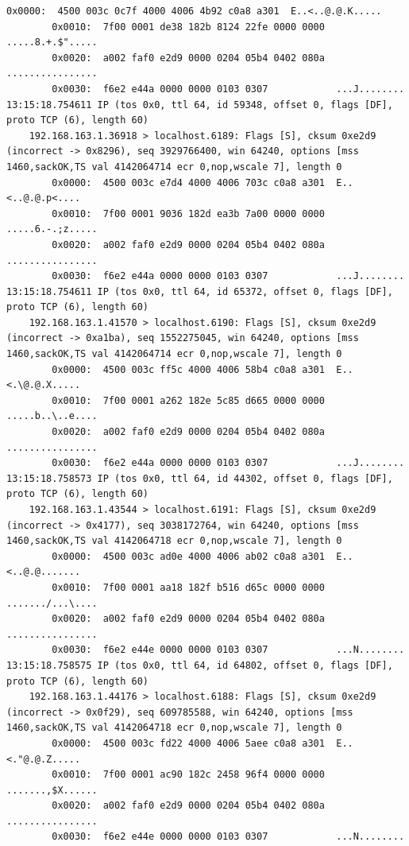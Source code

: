 \documentclass[11pt, a4paper]{article}
\begin{document}
\begin{Verbatim}[fontsize=\footnotesize,breaklines=true]
        0x0000:  4500 003c 0c7f 4000 4006 4b92 c0a8 a301  E..<..@.@.K.....
        0x0010:  7f00 0001 de38 182b 8124 22fe 0000 0000  .....8.+.$".....
        0x0020:  a002 faf0 e2d9 0000 0204 05b4 0402 080a  ................
        0x0030:  f6e2 e44a 0000 0000 0103 0307            ...J........
13:15:18.754611 IP (tos 0x0, ttl 64, id 59348, offset 0, flags [DF], proto TCP (6), length 60)
    192.168.163.1.36918 > localhost.6189: Flags [S], cksum 0xe2d9 (incorrect -> 0x8296), seq 3929766400, win 64240, options [mss 1460,sackOK,TS val 4142064714 ecr 0,nop,wscale 7], length 0
        0x0000:  4500 003c e7d4 4000 4006 703c c0a8 a301  E..<..@.@.p<....
        0x0010:  7f00 0001 9036 182d ea3b 7a00 0000 0000  .....6.-.;z.....
        0x0020:  a002 faf0 e2d9 0000 0204 05b4 0402 080a  ................
        0x0030:  f6e2 e44a 0000 0000 0103 0307            ...J........
13:15:18.754611 IP (tos 0x0, ttl 64, id 65372, offset 0, flags [DF], proto TCP (6), length 60)
    192.168.163.1.41570 > localhost.6190: Flags [S], cksum 0xe2d9 (incorrect -> 0xa1ba), seq 1552275045, win 64240, options [mss 1460,sackOK,TS val 4142064714 ecr 0,nop,wscale 7], length 0
        0x0000:  4500 003c ff5c 4000 4006 58b4 c0a8 a301  E..<.\@.@.X.....
        0x0010:  7f00 0001 a262 182e 5c85 d665 0000 0000  .....b..\..e....
        0x0020:  a002 faf0 e2d9 0000 0204 05b4 0402 080a  ................
        0x0030:  f6e2 e44a 0000 0000 0103 0307            ...J........
13:15:18.758573 IP (tos 0x0, ttl 64, id 44302, offset 0, flags [DF], proto TCP (6), length 60)
    192.168.163.1.43544 > localhost.6191: Flags [S], cksum 0xe2d9 (incorrect -> 0x4177), seq 3038172764, win 64240, options [mss 1460,sackOK,TS val 4142064718 ecr 0,nop,wscale 7], length 0
        0x0000:  4500 003c ad0e 4000 4006 ab02 c0a8 a301  E..<..@.@.......
        0x0010:  7f00 0001 aa18 182f b516 d65c 0000 0000  ......./...\....
        0x0020:  a002 faf0 e2d9 0000 0204 05b4 0402 080a  ................
        0x0030:  f6e2 e44e 0000 0000 0103 0307            ...N........
13:15:18.758575 IP (tos 0x0, ttl 64, id 64802, offset 0, flags [DF], proto TCP (6), length 60)
    192.168.163.1.44176 > localhost.6188: Flags [S], cksum 0xe2d9 (incorrect -> 0x0f29), seq 609785588, win 64240, options [mss 1460,sackOK,TS val 4142064718 ecr 0,nop,wscale 7], length 0
        0x0000:  4500 003c fd22 4000 4006 5aee c0a8 a301  E..<."@.@.Z.....
        0x0010:  7f00 0001 ac90 182c 2458 96f4 0000 0000  .......,$X......
        0x0020:  a002 faf0 e2d9 0000 0204 05b4 0402 080a  ................
        0x0030:  f6e2 e44e 0000 0000 0103 0307            ...N........

\end{Verbatim}
\end{document}
